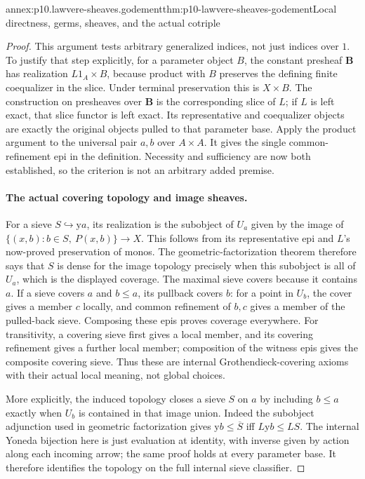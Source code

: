\begin{annexitem}{annex:p10.lawvere-sheaves.godement}{thm:p10-lawvere-sheaves-godement}{Local directness, germs, sheaves, and the actual cotriple}
\begin{proof}
This argument tests arbitrary generalized indices,
not just indices over \(1\).  To justify that step
explicitly, for a parameter object \(B\), the
constant presheaf \(\mathbf B\) has realization
\(L1_A\times B\), because product with \(B\)
preserves the defining finite coequalizer in the
slice.  Under terminal preservation this is
\(X\times B\).  The construction on presheaves
over \(\mathbf B\) is the corresponding slice
of \(L\); if \(L\) is left exact, that slice
functor is left exact.  Its representative and
coequalizer objects are exactly the original
objects pulled to that parameter base.  Apply
the product argument to the universal pair
\(a,b\) over \(A\times A\).  It gives the
single common-refinement epi in the definition.
Necessity and sufficiency are now both established,
so the criterion is not an arbitrary added premise.

\paragraph{The actual covering topology and image sheaves.}
For a sieve \(S\hookrightarrow\mathrm ya\), its
realization is the subobject of \(U_a\) given by
the image of \(\{(x,b):b\in S,\ P(x,b)\}\to X\).
This follows from its representative epi and
\(L\)'s now-proved preservation of monos.
The geometric-factorization theorem therefore says
that \(S\) is dense for the image topology
precisely when this subobject is all of \(U_a\),
which is the displayed coverage.
The maximal sieve covers because it contains \(a\).
If a sieve covers \(a\) and \(b\leq a\), its
pullback covers \(b\): for a point in \(U_b\),
the cover gives a member \(c\) locally, and
common refinement of \(b,c\) gives a member of
the pulled-back sieve.  Composing these epis
proves coverage everywhere.  For transitivity,
a covering sieve first gives a local member,
and its covering refinement gives a further
local member; composition of the witness epis
gives the composite covering sieve.  Thus these
are internal Grothendieck-covering axioms with
their actual local meaning, not global choices.

More explicitly, the induced topology closes a
sieve \(S\) on \(a\) by including \(b\leq a\)
exactly when \(U_b\) is contained in that image
union.  Indeed the subobject adjunction used
in geometric factorization gives
\(\mathrm yb\leq\overline S\) iff
\(L\mathrm yb\leq LS\).  The internal Yoneda
bijection here is just evaluation at identity,
with inverse given by action along each incoming
arrow; the same proof holds at every parameter
base.  It therefore identifies the topology
on the full internal sieve classifier.


\end{proof}
\end{annexitem}
